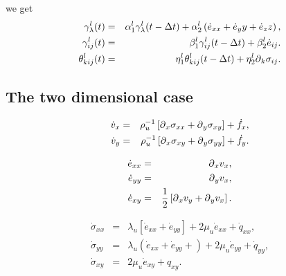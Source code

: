 \documentclass[11pt]{article}
\begin{document}
%
we get
\begin{eqnarray}
\gamma^l_{\lambda}(t)  & = &\alpha^l_1 \gamma^l_{\lambda}(t-\Delta t) 
                        + \alpha^l_2\left( \dot{e}_{xx}+ \dot{e}_yy+
                          \dot{e}_zz\right) ,\nonumber \\
\gamma^l_{ij}(t)      & = &\beta^l_1 \gamma^l_{ij}(t - \Delta t) 
                        + \beta^l_2\dot{e}_{ij}.\nonumber\\
\theta^l_{kij}(t)      & = &\eta^l_{1} \theta^l_{kij}(t - \Delta t) 
                        + \eta^l_2\mbox{$\partial$}_k \sigma_{ij}.\nonumber\\
\end{eqnarray}
%

\subsection{The two dimensional case}

\begin{eqnarray}
  \dot{v}_x & = & \rho^{-1}_u\left[\mbox{$\partial$}_x \sigma_{xx} 
             +\mbox{$\partial$}_y \sigma_{xy}\right] + \dot{f}_x ,            \nonumber \\  
  \dot{v}_y & = & \rho^{-1}_u\left[\mbox{$\partial$}_x \sigma_{xy} 
             +\mbox{$\partial$}_y \sigma_{yy}\right] + \dot{f}_y .            \nonumber 
\end{eqnarray}

\begin{eqnarray}
  \dot{e}_{xx} & = & \mbox{$\partial$}_x v_x,                                  \nonumber \\
  \dot{e}_{yy} & = & \mbox{$\partial$}_y v_x,                                  \nonumber \\
  \dot{e}_{xy} & = & \frac{1}{2}\left[\mbox{$\partial$}_x v_y+\mbox{$\partial$}_y v_x\right]. \nonumber 
\end{eqnarray}

\begin{eqnarray}
  \dot{\sigma}_{xx} 
     & = & \lambda_u \left [\dot{e}_{xx} 
                 + \dot{e}_{yy} \right]
                 + 2\mu_u \dot{e}_{xx} +\dot{q}_{xx},           \nonumber\\ 
  \dot{\sigma}_{yy} 
     & = & \lambda_u \left (\dot{e}_{xx} 
                 +\dot{e}_{yy} + \right)
                 + 2\mu_u \dot{e}_{yy} +\dot{q}_{yy},           \nonumber\\
  \dot{\sigma}_{xy} 
    & = & 2\mu_u \dot{e}_{xy} +q_{xy}.                          \nonumber 
\end{eqnarray}
\end{document}
